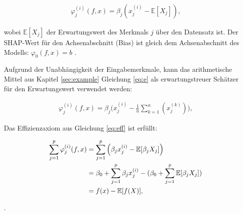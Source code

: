 \begin{align}
    \label{eq:shap-single}
    \varphi_j^{(i)}(f, x) = \beta_j (x_j^{(i)} - \mathbb{E}[X_j]),
\end{align}

wobei \( \mathbb{E}[X_j] \) der Erwartungswert des Merkmals \( j \) über den 
Datensatz ist. Der SHAP-Wert für den Achsenabschnitt (Bias) ist gleich 
dem Achsenabschnitt des Modells: \( \varphi_0(f, x) = b \) \cite[S. 6]{NIPS2017_8a20a862}.

Aufgrund der Unabhängigkeit der Eingabemerkmale, kann das arithmetische Mittel aus Kapitel 
\ref{sec:example} Gleichung \ref{eq:e} als erwartungstreuer Schätzer für den Erwartungswert verwendet werden:

\begin{align}
    \varphi_j^{(i)}(f, x) = \beta_j \Big(x_j^{(i)} - \frac{1}{n} \sum_{k=1}^{n} (x_j^{(k)})\Big),
\end{align}

Das Effizienzaxiom aus Gleichung \ref{eq:eff} ist erfüllt:

\begin{align}
    \sum_{j=1}^p \varphi_j^{(i)}(f, x) &= \sum_{j=1}^p  \Big( \beta_j x_j^{(i)} - \mathbb{E}[\beta_j X_j]\Big) \\ \notag
                                    &= \beta_0 + \sum_{j=1}^p \beta_j x_j^{(i)} - ( \beta_0 + \sum_{j=1}^p \mathbb{E}[\beta_j X_j]) \\ \notag
                                    &= f(x) - \mathbb{E}[f(X)],
\end{align}                 

\cite[S. 48]{Molnar_2023}.